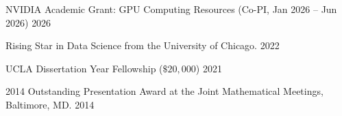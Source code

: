 

\begin{cvhonors}

  \cvhonor
    {NVIDIA Academic Grant: GPU Computing Resources (Co-PI, Jan 2026 -- Jun 2026)} %
    {2026} %

  \cvhonor
    {{Rising Star in Data Science from the University of Chicago.} \href{https://datascience.uchicago.edu/research/postdoctoral-programs/rising-stars/2022/}{ }} %
    {2022} %

  \cvhonor
    {UCLA Dissertation Year Fellowship ($\$ 20,000$)} %
    {2021} %

  \cvhonor
    {2014 Outstanding Presentation Award at the Joint Mathematical Meetings, Baltimore, MD.} %
    {2014} %

\end{cvhonors}
